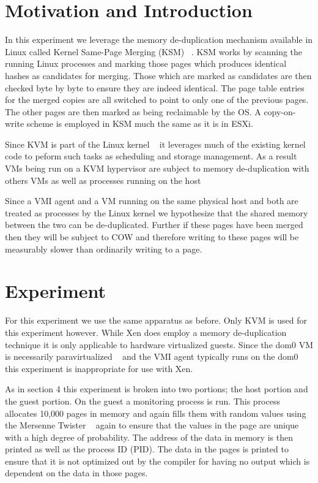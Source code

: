 \label{PageMergeChap}

\section{Motivation and Introduction}\label{PageMergeChap-intro}
In this experiment we leverage the memory de-duplication mechanism available in Linux called Kernel Same-Page Merging (KSM) ~\cite{arcangeli_increasing_2009}. KSM works by scanning the running Linux processes and marking those pages which produces identical hashes as candidates for merging. Those which are marked as candidates are then checked byte by byte to ensure they are indeed identical. The page table entries for the merged copies are all switched to point to only one of the previous pages. The other pages are then marked as being reclaimable by the OS. A copy-on-write scheme is employed in KSM much the same as it is in ESXi.

Since KVM is part of the Linux kernel ~\cite{_Linux_archive} it leverages much of the existing kernel code to peform such tasks as scheduling and storage management. As a result VMs being run on a KVM hypervisor are subject to memory de-duplication with others VMs as well as processes running on the host

Since a VMI agent and a VM running on the same physical host and both are treated as processes by the Linux kernel we hypothesize that the shared memory between the two can be de-duplicated. Further if these pages have been merged then they will be subject to COW and therefore writing to these pages will be measurably slower than ordinarily writing to a page.

\section{Experiment}\label{PageMergeChap-Exp}
For this experiment we use the same apparatus as before. Only KVM is used for this experiment however. While Xen does employ a memory de-duplication technique it is only applicable to hardware virtualized guests. Since the dom0 VM is necessarily paravirtualized ~\cite{barham_xen_2003} and the VMI agent typically runs on the dom0 this experiment is inappropriate for use with Xen. 

As in section 4 this experiment is broken into two portions; the host portion and the guest portion. On the guest a monitoring process is run. This process allocates 10,000 pages in memory and again fills them with random values using the Mersenne Twister ~\cite{matsumoto_mersenne_1998} again to ensure that the values in the page are unique with a high degree of probability. The address of the data in memory is then printed as well as the process ID (PID). The data in the pages is printed to ensure that it is not optimized out by the compiler for having no output which is dependent on the data in those pages.

